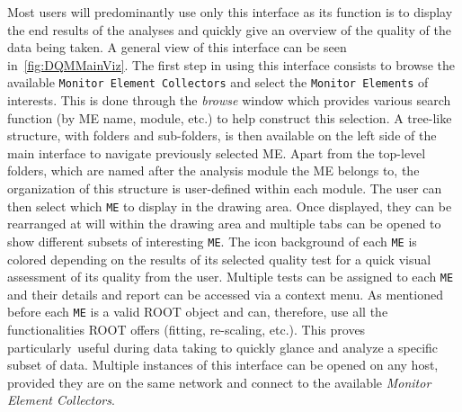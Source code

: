 \documentclass{webofc}
\begin{document}
Most users will predominantly use only this interface as its function is to display the end results of the analyses and quickly give an overview of the quality of the data being taken.
A general view of this interface can be seen in~\autoref{fig:DQMMainViz}.
The first step in using this interface consists to browse the available \texttt{Monitor Element Collectors} and select the \texttt{Monitor Elements} of interests.
This is done through the \textit{browse} window which provides various search function (by ME name, module, etc.) to help construct this selection.
A tree-like structure, with folders and sub-folders, is then available on the left side of the main interface to navigate previously selected ME.
Apart from the top-level folders, which are named after the analysis module the ME belongs to, the organization of this structure is user-defined within each module.
The user can then select which \texttt{ME} to display in the drawing area.
Once displayed, they can be rearranged at will within the drawing area and multiple tabs can be opened to show different subsets of interesting \texttt{ME}.
The icon background of each \texttt{ME} is colored depending on the results of its selected quality test for a quick visual assessment of its quality from the user.
Multiple tests can be assigned to each \texttt{ME} and their details and report can be accessed via a context menu.
As mentioned before each \texttt{ME} is a valid ROOT object and can, therefore, use all the functionalities ROOT offers (fitting, re-scaling, etc.).
This proves particularly useful during data taking to quickly glance and analyze a specific subset of data.
Multiple instances of this interface can be opened on any host, provided they are on the same network and connect to the available \textit{Monitor Element Collectors}.
\end{document}
